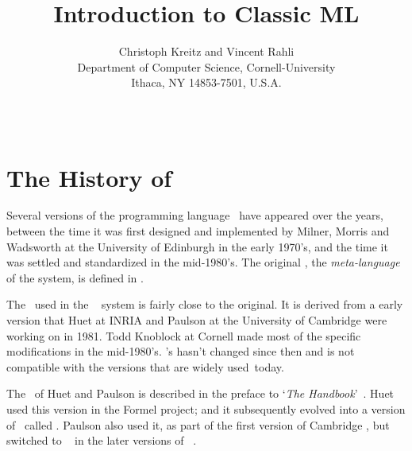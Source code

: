 \documentclass[11pt]{article}
\begin{document}
\title{\bf Introduction to Classic ML}
\author{Christoph Kreitz and Vincent Rahli
	\\[2mm]
	Department of Computer Science, Cornell-University \\
            	  Ithaca, NY 14853-7501, U.S.A.
	\\[2mm]
	\small
       	}
\date{~}


\maketitle

\section{The History of {\ML}}
\label{sec:ML-history}

Several versions of the programming language \ML{}\ have
appeared over the years, between the time it was first designed and implemented
by Milner, Morris  and
Wadsworth at the University of Edinburgh in the early
1970's, and the time it was settled and standardized in the mid-1980's.  The
original \ML, the {\em meta-language\/} of the  system,
is defined in \cite{Gordon+Milner+Wadsworth:1979}.

The \ML\ used in the {\Nuprl}~\cite{Constable+al:1986,Kreitz:02,Allen+al:2006}
system is fairly close to the original. It is derived from a early
version that Huet at {\small INRIA} and
Paulson  at the University of Cambridge were
working on in 1981.  Todd Knoblock at Cornell made most of the
{\Nuprl} specific modifications in the mid-1980's.  {\Nuprl}'s {\ML}
hasn't changed since then and is not compatible with the {\ML}
versions that are widely used~today.\smallskip

The \ML\ of Huet and Paulson is described in the preface to `{\em The {\ML}
Handbook\/}'~\cite{mi:ml-handbook84a}.  Huet used this version in the Formel
project; and it subsequently evolved into a version of \ML\ called .  Paulson also used
it, as part of the first version of Cambridge \LCF, but switched to
~\cite{Milner+Tofte+Harper:1990,Milner+Tofte+Harper+Macqueen:1997}
in the later versions of ~\cite{bo:Paulson87a}.
\end{document}
